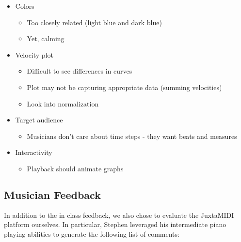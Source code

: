 \documentclass[journal]{vgtc}                %
\begin{document}
\begin{itemize}
  \item Colors
  \begin{itemize}
    \item Too closely related (light blue and dark blue)
    \item Yet, calming
  \end{itemize}
  \item Velocity plot
  \begin{itemize}
    \item Difficult to see differences in curves
    \item Plot may not be capturing appropriate data (summing velocities)
    \item Look into normalization
  \end{itemize}
  \item Target audience
  \begin{itemize}
    \item Musicians don't care about time steps - they want beats and measures
  \end{itemize}
  \item Interactivity
  \begin{itemize}
    \item Playback should animate graphs
  \end{itemize}
\end{itemize}

\subsection{Musician Feedback}

In addition to the in class feedback, we also chose to evaluate the JuxtaMIDI
platform ourselves. In particular, Stephen leveraged his intermediate piano
playing abilities to generate the following list of comments:
\end{document}
